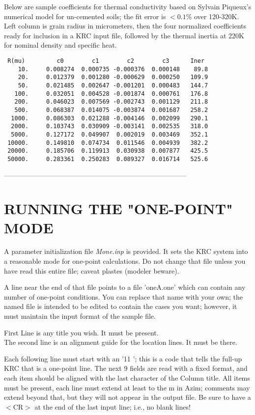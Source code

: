 \documentclass{article}
\newcommand{\nf}{\textit}  %
\begin{document}
Below are sample coefficients for thermal conductivity based on Sylvain
Piqueux's numerical model for un-cemented soils; the fit error is $<0.1$\% over
120-320K. Left column is grain radius in micrometers, then the four normalized
coefficients ready for inclusion in a KRC input file, followed by the thermal
inertia at 220K for nominal density and specific heat.
\vspace{-3.mm} 
\begin{verbatim}
 R(mu)         c0        c1        c2        c3      Iner  
    10.     0.008274  0.000735 -0.000376  0.000148    89.8 
    20.     0.012379  0.001280 -0.000629  0.000250   109.9 
    50.     0.021485  0.002647 -0.001201  0.000483   144.7 
   100.     0.032051  0.004528 -0.001874  0.000761   176.8 
   200.     0.046023  0.007569 -0.002743  0.001129   211.8 
   500.     0.068387  0.014075 -0.003874  0.001687   258.2 
  1000.     0.086303  0.021288 -0.004146  0.002099   290.1 
  2000.     0.103743  0.030909 -0.003141  0.002535   318.0 
  5000.     0.127172  0.049907  0.002019  0.003469   352.1 
 10000.     0.149810  0.074734  0.011546  0.004939   382.2 
 20000.     0.185706  0.119913  0.030938  0.007877   425.5 
 50000.     0.283361  0.250283  0.089327  0.016714   525.6 
\end{verbatim}

--------------------------------------------------------------------------------

 \section{RUNNING THE "ONE-POINT" MODE} %

A parameter initialization file   \nf{Mone.inp}  is provided. It sets the KRC 
system into a reasonable mode for one-point calculations. Do not change that 
file unless you have read this entire file; caveat plastes (modeler beware).

A line near the end of that file points to a file 'oneA.one' which can contain
any number of one-point conditions. You can replace that name with your own; the
named file is intended to be edited to contain the cases you want; however, it
must maintain the input format of the sample file.

First Line is any title you wish. It must be present. \\
The second line is an alignment guide for the location lines. It must be there.

Each following line must start with an '11 '; this is a code that tells the
full-up KRC that is a one-point line. The next 9 fields are read with a fixed
format, and each item should be aligned with the last character of the Column
title. All items must be present, each line must extend at least to the m in
Azim; comments may extend beyond that, but they will not appear in the output
file. Be sure to have a $<$CR$>$ at the end of the last input line; i.e., no
blank lines!
\end{document}
